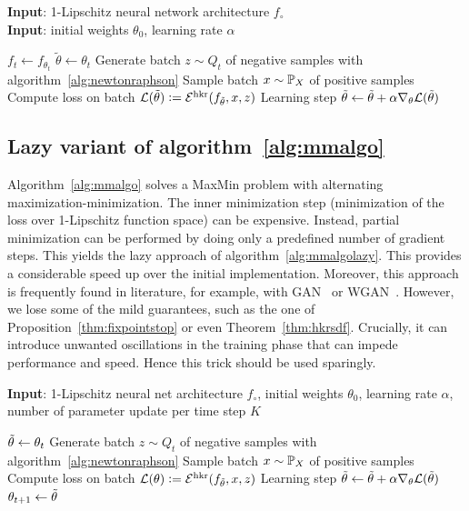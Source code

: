 \begin{algorithm}%
\caption{Alternating Minimization for Signed Distance Function learning}
\label{alg:mmalgo}
\textbf{Input}: 1-Lipschitz neural network architecture $f_{\circ}$\\
\textbf{Input}: initial weights $\theta_0$, learning rate $\alpha$
\begin{algorithmic}[1] %
\REPEAT
\STATE $f_t\gets f_{\theta_t}$
\STATE $\tilde\theta\gets \theta_t$
    \REPEAT
    \STATE Generate batch $z\sim Q_t$ of negative samples with algorithm~\ref{alg:newtonraphson}
    \STATE Sample batch $x\sim\mathbb{P}_X$ of positive samples
    \STATE Compute loss on batch $\mathcal{L}(\tilde\theta)\vcentcolon=\mathcal{E}^{\text{hkr}}(f_{\tilde\theta},x,z)$
    \STATE Learning step $\tilde\theta\gets \tilde\theta+\alpha\nabla_{\theta}\mathcal{L}(\tilde\theta)$
\end{algorithmic}
\end{algorithm}

\subsection{Lazy variant of algorithm~\ref{alg:mmalgo}}

Algorithm~\ref{alg:mmalgo} solves a MaxMin problem with alternating maximization-minimization. The inner minimization step (minimization of the loss over 1-Lipschitz function space) can be expensive. Instead, partial minimization can be performed by doing only a predefined number of gradient steps. This yields the lazy approach of algorithm~\ref{alg:mmalgolazy}. This provides a considerable speed up over the initial implementation. Moreover, this approach is frequently found in literature, for example, with GAN~\cite{} or WGAN~\cite{}. However, we lose some of the mild guarantees, such as the one of Proposition~\ref{thm:fixpointstop} or even Theorem~\ref{thm:hkrsdf}. Crucially, it can introduce unwanted oscillations in the training phase that can impede performance and speed. Hence this trick should be used sparingly.   

\begin{algorithm}%
\caption{One Class Signed Distance Function learning}
\label{alg:mmalgolazy}
\textbf{Input}: 1-Lipschitz neural net architecture $f_{\circ}$, initial weights $\theta_0$, learning rate $\alpha$, number of parameter update per time step $K$
\begin{algorithmic}[1] %
\REPEAT
\STATE $\Tilde{\theta} \gets \theta_t$
\STATE Generate batch $z\sim Q_t$ of negative samples with algorithm~\ref{alg:newtonraphson}
\STATE Sample batch $x\sim\mathbb{P}_X$ of positive samples
\STATE Compute loss on batch $\mathcal{L}(\theta)\vcentcolon=\mathcal{E}^{\text{hkr}}(f_{\Tilde{\theta}},x,z)$
\STATE Learning step $\Tilde{\theta} \gets\Tilde{\theta}+\alpha\nabla_{\theta}\mathcal{L}(\Tilde{\theta})$
\ENDFOR
\STATE $\theta_{t+1} \gets \Tilde{\theta}$
\end{algorithmic}
\end{algorithm}
\vspace{-0.3cm}

